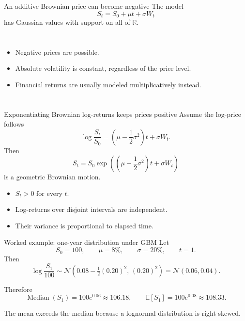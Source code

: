 \documentclass[10pt,aspectratio=169]{beamer}
\newcommand{\E}{\mathbb E}
\newcommand{\R}{\mathbb R}
\begin{document}
\begin{frame}{An additive Brownian price can become negative}
The model
\[
S_t=S_0+\mu t+\sigma W_t
\]
has Gaussian values with support on all of \(\R\).
\begin{columns}[T,onlytextwidth]
\begin{itemize}
  \item Negative prices are possible.
  \item Absolute volatility is constant, regardless of the price level.
  \item Financial returns are usually modeled multiplicatively instead.
\end{itemize}
\centering
{}
\end{columns}
\end{frame}

\begin{frame}{Exponentiating Brownian log-returns keeps prices positive}
Assume the log-price follows
\[
\log\frac{S_t}{S_0}
=\left(\mu-\frac12\sigma^2\right)t+\sigma W_t.
\]
Then
\[
\boxed{
S_t=S_0
\exp\!\left(
\left(\mu-\frac12\sigma^2\right)t+\sigma W_t
\right)}
\]
is a geometric Brownian motion.
\begin{itemize}
  \item \(S_t>0\) for every \(t\).
  \item Log-returns over disjoint intervals are independent.
  \item Their variance is proportional to elapsed time.
\end{itemize}
\end{frame}

\begin{frame}{Worked example: one-year distribution under GBM}
Let
\[
S_0=100,
\qquad \mu=8\%,
\qquad \sigma=20\%,
\qquad t=1.
\]
Then
\[
\log\frac{S_1}{100}
\sim\mathcal N(0.08-\tfrac12(0.20)^2,\,(0.20)^2)
=\mathcal N(0.06,0.04).
\]

Therefore
\[
\operatorname{Median}(S_1)=100e^{0.06}\approx106.18,
\qquad
\E[S_1]=100e^{0.08}\approx108.33.
\]

The mean exceeds the median because a lognormal distribution is right-skewed.
\end{frame}
\end{document}
